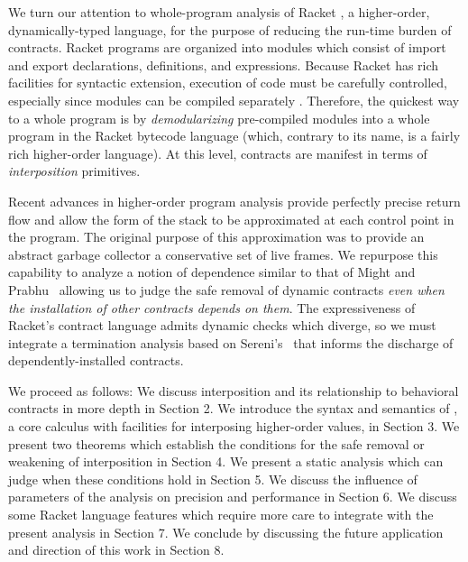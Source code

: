 We turn our attention to whole-program analysis of Racket \cite{plt-tr1}, a higher-order, dynamically-typed language, for the purpose of reducing the run-time burden of contracts.
Racket programs are organized into modules which consist of import and export declarations, definitions, and expressions.
Because Racket has rich facilities for syntactic extension, execution of code must be carefully controlled, especially since modules can be compiled separately \cite{flatt2002composable}.
Therefore, the quickest way to a whole program is by \emph{demodularizing} pre-compiled modules into a whole program in the Racket bytecode language (which, contrary to its name, is a fairly rich higher-order language).
At this level, contracts are manifest in terms of \emph{interposition} primitives.

Recent advances in higher-order program analysis \cite{earl2012introspective} provide perfectly precise return flow and allow the form of the stack to be approximated at each control point in the program.
The original purpose of this approximation was to provide an abstract garbage collector a conservative set of live frames.
We repurpose this capability to analyze a notion of dependence similar to that of Might and Prabhu~\cite{might2009interprocedural} allowing us to judge the safe removal of dynamic contracts \emph{even when the installation of other contracts depends on them}.
The expressiveness of Racket's contract language admits dynamic checks which diverge, so we must integrate a termination analysis based on Sereni's~\cite{sereni2007termination} that informs the discharge of dependently-installed contracts.

We proceed as follows:
We discuss interposition and its relationship to behavioral contracts in more depth in Section 2.
We introduce the syntax and semantics of \chapcalc, a core calculus with facilities for interposing higher-order values, in Section 3.
We present two theorems which establish the conditions for the safe removal or weakening of interposition in Section 4.
We present a static analysis which can judge when these conditions hold in Section 5.
We discuss the influence of parameters of the analysis on precision and performance in Section 6.
We discuss some Racket language features which require more care to integrate with the present analysis in Section 7.
We conclude by discussing the future application and direction of this work in Section 8.